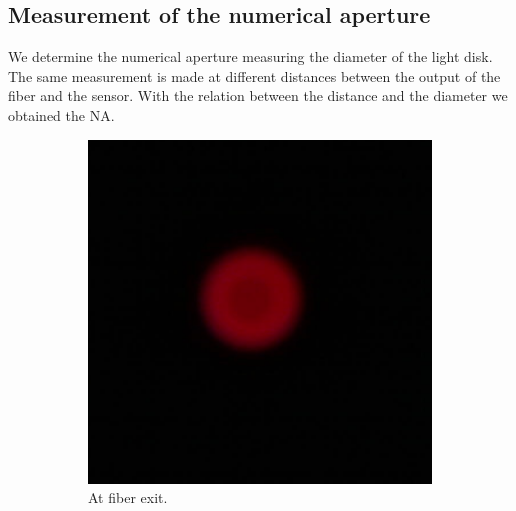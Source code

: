 \documentclass[a4paper, 12pt]{paper}
\begin{document}
\subsection{Measurement of the numerical aperture}

We determine the numerical aperture measuring the diameter of the light disk.
The same measurement is made at different distances between the output of the fiber and the sensor.
With the relation between the distance and the diameter we obtained the NA.

\begin{figure}[H]
    \centering
    \begin{subfigure}[b]{0.45\textwidth}
        \includegraphics[width=\textwidth]{img/led_0}
        \caption{At fiber exit.}
    \end{subfigure}
    \begin{subfigure}[b]{0.45\textwidth}

\end{subfigure}
\end{figure}
\end{document}
